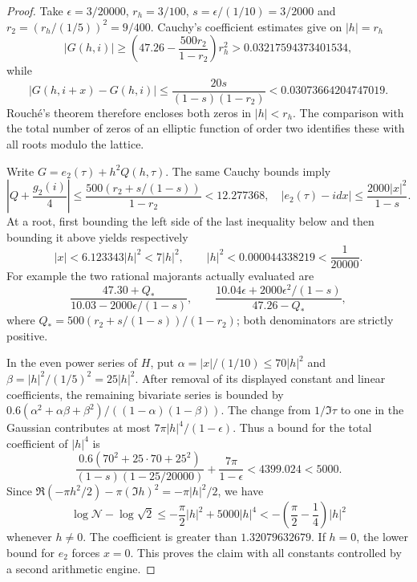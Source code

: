 \begin{proof}
Take $\epsilon=3/20000$, $r_h=3/100$,
$s=\epsilon/(1/10)=3/2000$ and $r_2=(r_h/(1/5))^2=9/400$.
Cauchy's coefficient estimates give on $|h|=r_h$
\[
 |G(h,i)|\geq
 \left(47.26-\frac{500r_2}{1-r_2}\right)r_h^2
       >0.03217594373401534,
\]
while
\[
 |G(h,i+x)-G(h,i)|\leq
 \frac{20s}{(1-s)(1-r_2)}<0.03073664204747019.
\]
Rouch\'e's theorem therefore encloses both zeros in $|h|<r_h$.
The comparison with the total number of zeros of an elliptic function
of order two identifies these with all roots modulo the lattice.

Write $G=e_2(\tau)+h^2Q(h,\tau)$. The same Cauchy bounds imply
\[
 \left|Q+\frac{g_2(i)}4\right|
 \leq\frac{500(r_2+s/(1-s))}{1-r_2}<12.277368,
 \quad
 |e_2(\tau)-idx|\leq\frac{2000|x|^2}{1-s}.
\]
At a root, first bounding the left side of the last inequality below
and then bounding it above yields respectively
\[
 |x|<6.123343|h|^2<7|h|^2,
 \qquad |h|^2<0.000044338219<\frac1{20000}.
\]
For example the two rational majorants actually evaluated are
\[
 \frac{47.30+Q_*}{10.03-2000\epsilon/(1-s)},
 \qquad
 \frac{10.04\epsilon+2000\epsilon^2/(1-s)}{47.26-Q_*},
\]
where $Q_*=500(r_2+s/(1-s))/(1-r_2)$; both denominators are
strictly positive.

In the even power series of $H$, put
$\alpha=|x|/(1/10)\leq70|h|^2$ and
$\beta=|h|^2/(1/5)^2=25|h|^2$. After removal of its displayed
constant and linear coefficients, the remaining bivariate series is
bounded by
$0.6(\alpha^2+\alpha\beta+\beta^2)/((1-\alpha)(1-\beta))$.
The change from $1/\Im\tau$ to one in the Gaussian contributes
at most $7\pi|h|^4/(1-\epsilon)$. Thus a bound for the total
coefficient of $|h|^4$ is
\[
 \frac{0.6(70^2+25\cdot70+25^2)}
 {(1-s)(1-25/20000)}+\frac{7\pi}{1-\epsilon}
 <4399.024<5000.
\]
Since $\Re(-\pi h^2/2)-\pi(\Im h)^2=-\pi|h|^2/2$, we have
\[
 \log\mathcal N-\log\sqrt2
 \leq-\frac\pi2|h|^2+5000|h|^4
 <-\left(\frac\pi2-\frac14\right)|h|^2
\]
whenever $h\ne0$. The coefficient is greater than $1.32079632679$.
If $h=0$, the lower bound for $e_2$ forces $x=0$. This proves the
claim with all constants controlled by a second arithmetic engine.
\end{proof}


